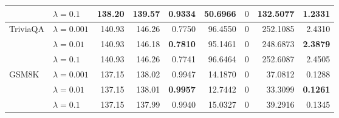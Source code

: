 \begin{table}[t]
{\begin{tabular}{l l rrrrrrr}
 & $\lambda{=}0.1$ & 138.20 & 139.57 & \cellcolor{red!18} 0.9334 & \cellcolor{red!18} 50.6966 & \cellcolor{cyan!12} $0$ & \cellcolor{red!18} 132.5077 & \cellcolor{red!18} 1.2331 \\
\midrule
TriviaQA & $\lambda{=}0.001$ & 140.93 & 146.26 & \cellcolor{red!35} 0.7750 & \cellcolor{red!35} 96.4550 & \cellcolor{cyan!12} $0$ & \cellcolor{red!35} 252.1085 & \cellcolor{red!35} 2.4310 \\
 & $\lambda{=}0.01$ & 140.93 & 146.18 & \cellcolor{red!35} \textbf{0.7810} & \cellcolor{red!35} 95.1461 & \cellcolor{cyan!12} $0$ & \cellcolor{red!35} 248.6873 & \cellcolor{red!35} \textbf{2.3879} \\
 & $\lambda{=}0.1$ & 140.93 & 146.26 & \cellcolor{red!35} 0.7741 & \cellcolor{red!35} 96.6464 & \cellcolor{cyan!12} $0$ & \cellcolor{red!35} 252.6087 & \cellcolor{red!35} 2.4505 \\
\midrule
GSM8K & $\lambda{=}0.001$ & 137.15 & 138.02 & 0.9947 & 14.1870 & \cellcolor{cyan!12} $0$ & 37.0812 & 0.1288 \\
 & $\lambda{=}0.01$ & 137.15 & 138.01 & \textbf{0.9957} & 12.7442 & \cellcolor{cyan!12} $0$ & 33.3099 & \textbf{0.1261} \\
 & $\lambda{=}0.1$ & 137.15 & 137.99 & 0.9940 & 15.0327 & \cellcolor{cyan!12} $0$ & 39.2916 & 0.1345 \\
\bottomrule
\end{tabular}}
\end{table}